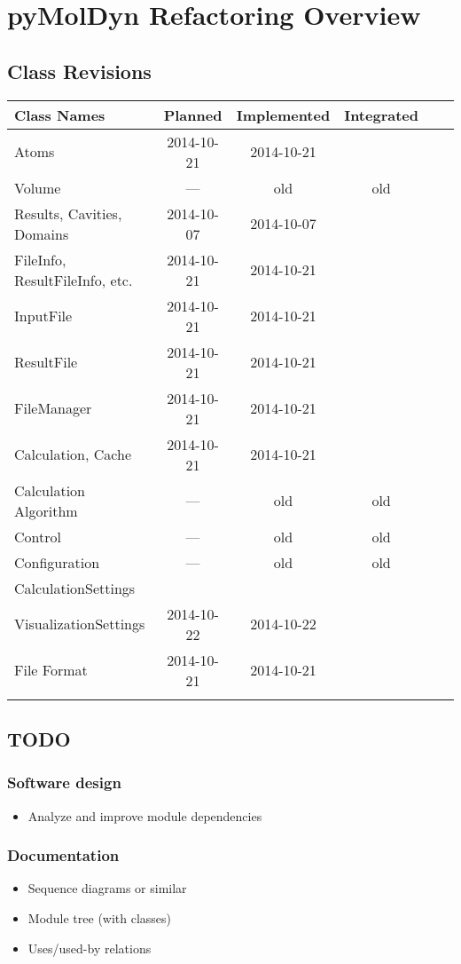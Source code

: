 \documentclass[final, oneside, a4paper, 11pt, pdftex, english]{scrreprt}
\begin{document}
\chapter*{pyMolDyn Refactoring Overview}
\section*{Class Revisions}

\begin{tabular}{|l|c|c|c|c|c|}
    \hline
    \textbf{Class Names} & \textbf{Planned} & \textbf{Implemented} & \textbf{Integrated} \\
    \hline
    Atoms & 2014-10-21 & 2014-10-21 & \\
    \hline
    Volume & --- & old & old \\
    \hline
    Results, Cavities, Domains & 2014-10-07 & 2014-10-07 & \\
    \hline
    FileInfo, ResultFileInfo, etc. & 2014-10-21 & 2014-10-21 & \\
    \hline
    InputFile & 2014-10-21 & 2014-10-21 & \\
    \hline
    ResultFile & 2014-10-21 & 2014-10-21 & \\
    \hline
    FileManager & 2014-10-21 & 2014-10-21 & \\
    \hline
    Calculation, Cache & 2014-10-21 & 2014-10-21 & \\
    \hline
    Calculation Algorithm & --- & old & old \\
    \hline
    Control & --- & old & old \\
    \hline
    Configuration & --- & old & old \\
    \hline
    CalculationSettings & & & \\
    \hline
    VisualizationSettings & 2014-10-22 & 2014-10-22 & \\
    \hline
    File Format & 2014-10-21 & 2014-10-21 & \\
    \hline
    & & & \\
    \hline
\end{tabular}


\section*{TODO}
\subsection*{Software design}
\begin{itemize}\itemsep0pt
    \item Analyze and improve module dependencies
\end{itemize}


\subsection*{Documentation}
\begin{itemize}\itemsep0pt
    \item Sequence diagrams or similar
    \item Module tree (with classes)
    \item Uses/used-by relations
\end{itemize}
\end{document}
